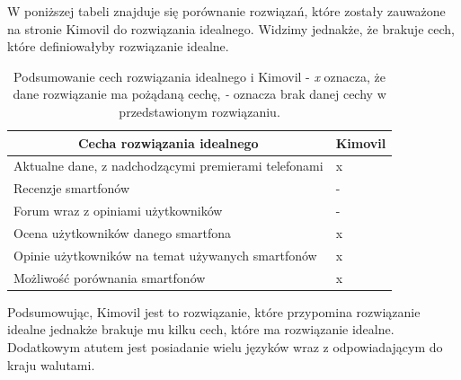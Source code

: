 W poniższej tabeli znajduje się porównanie rozwiązań, które zostały zauważone na stronie Kimovil do rozwiązania idealnego. Widzimy jednakże, że brakuje cech, które definiowałyby rozwiązanie idealne.
\begin{table}[H]
\centering
\begin{tabular}{|l|l|}
    \hline
    \multicolumn{1}{|c|}{Cecha rozwiązania idealnego}    & \multicolumn{1}{c|}{Kimovil} \\ \hline
    Aktualne dane, z nadchodzącymi premierami telefonami & x                             \\ \hline
    Recenzje smartfonów                                  & -                                \\ \hline
    Forum wraz z opiniami użytkowników                   & -                                \\ \hline
    Ocena użytkowników danego smartfona                  & x                             \\ \hline
    Opinie użytkowników na temat używanych smartfonów    & x                                 \\ \hline
    Możliwość porównania smartfonów                      & x                                \\ \hline
\end{tabular}
\caption{Podsumowanie cech rozwiązania idealnego i Kimovil - \textit{x} oznacza, że dane rozwiązanie ma pożądaną cechę, \textit{-} oznacza brak danej cechy w przedstawionym rozwiązaniu.}
\label{comparison_kimovil}
\end{table}
Podsumowując, Kimovil jest to rozwiązanie, które przypomina rozwiązanie idealne jednakże brakuje mu kilku cech, które ma rozwiązanie idealne. Dodatkowym atutem jest posiadanie wielu języków wraz z odpowiadającym do kraju walutami.

